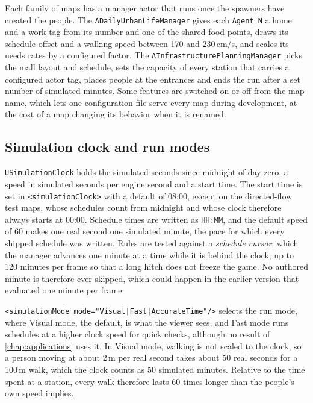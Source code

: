 Each family of maps has a manager actor that runs once the spawners have created the people. The \texttt{ADailyUrbanLifeManager} gives each \texttt{Agent\_N} a home and a work tag from its number and one of the shared food points, draws its schedule offset and a walking speed between 170 and 230\,cm/s, and scales its needs rates by a configured factor. The \texttt{AInfrastructurePlanningManager} picks the mall layout and schedule, sets the capacity of every station that carries a configured actor tag, places people at the entrances and ends the run after a set number of simulated minutes. Some features are switched on or off from the map name, which lets one configuration file serve every map during development, at the cost of a map changing its behavior when it is renamed.

\subsection{Simulation clock and run modes}\label{sec:clock-modes}

\texttt{USimulationClock} holds the simulated seconds since midnight of day zero, a speed in simulated seconds per engine second and a start time. The start time is set in \texttt{<simulationClock>} with a default of 08:00, except on the directed-flow test maps, whose schedules count from midnight and whose clock therefore always starts at 00:00. Schedule times are written as \texttt{HH:MM}, and the default speed of 60 makes one real second one simulated minute, the pace for which every shipped schedule was written. Rules are tested against a \emph{schedule cursor}, which the manager advances one minute at a time while it is behind the clock, up to 120 minutes per frame so that a long hitch does not freeze the game. No authored minute is therefore ever skipped, which could happen in the earlier version that evaluated one minute per frame.

\texttt{<simulationMode mode="Visual|Fast|AccurateTime"/>} selects the run mode, where Visual mode, the default, is what the viewer sees, and Fast mode runs schedules at a higher clock speed for quick checks, although no result of \cref{chap:applications} uses it. In Visual mode, walking is not scaled to the clock, so a person moving at about 2\,m per real second takes about 50 real seconds for a 100\,m walk, which the clock counts as 50 simulated minutes. Relative to the time spent at a station, every walk therefore lasts 60 times longer than the people's own speed implies.

